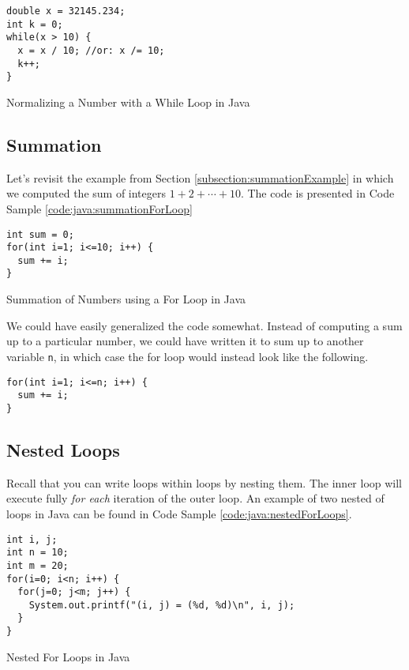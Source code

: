 \begin{listing}[H]
\begin{verbatim}
double x = 32145.234;
int k = 0;
while(x > 10) {
  x = x / 10; //or: x /= 10;
  k++;
}
\end{verbatim}
  \caption{Normalizing a Number with a While Loop in Java}
  \label{code:java:normalizeWhileLoop}
\end{listing}

\subsection{Summation}

Let's revisit the example from Section \ref{subsection:summationExample} in which
we computed the sum of integers $1 + 2 + \cdots + 10$.  The code is presented in
Code Sample \ref{code:java:summationForLoop}

\begin{listing}[H]
\begin{verbatim}
int sum = 0;
for(int i=1; i<=10; i++) {
  sum += i;
}
\end{verbatim}
  \caption{Summation of Numbers using a For Loop in Java}
  \label{code:java:summationForLoop}
\end{listing}

We could have easily generalized the code somewhat.  Instead of computing
a sum up to a particular number, we could have written it to sum up to another
variable \texttt{n}, in which case the for loop would instead look like the
following.

\begin{verbatim}
for(int i=1; i<=n; i++) {
  sum += i;
}
\end{verbatim}

\subsection{Nested Loops}

Recall that you can write loops within loops by nesting them.  The inner loop will execute fully 
\emph{for each} iteration of the outer loop.  An example of two nested of
loops in Java can be found in Code Sample \ref{code:java:nestedForLoops}.

\begin{listing}[H]
\begin{verbatim}
int i, j;
int n = 10;
int m = 20;
for(i=0; i<n; i++) {
  for(j=0; j<m; j++) {
    System.out.printf("(i, j) = (%d, %d)\n", i, j);
  }
}
\end{verbatim}
  \caption{Nested For Loops in Java}
  \label{code:java:nestedForLoops}
\end{listing}

